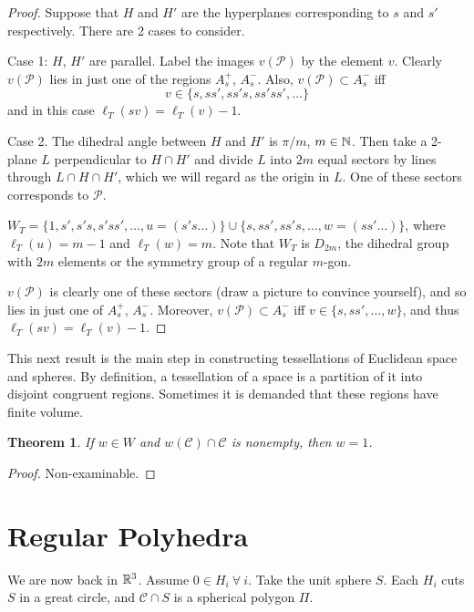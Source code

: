 \documentclass{notes}
\theoremstyle{plain}
\newtheorem{theorem}[proposition]{Theorem}
\newcommand{\cC}{\mathcal{C}}
\newcommand{\cP}{\mathcal{P}}
\begin{document}
\begin{proof}
Suppose that $H$ and $H'$ are the hyperplanes corresponding to $s$ and $s'$
respectively.  There are 2 cases to consider.

Case 1: $H$, $H'$ are parallel.  Label the images $v(\cP)$ by the element $v$.
Clearly $v(\cP)$ lies in just one of the regions $A_s^+$, $A_s^-$.  Also,
$v(\cP) \subset A_s^-$ iff
\[
v \in \{s, s s', s s' s, s s' s s', \dots \}
\]
and in this case $\ell_T(sv) = \ell_T(v) - 1$.

Case 2.  The dihedral angle between $H$ and $H'$ is $\pi/m$, $m \in \mathbb{N}$.  Then
take a 2-plane $L$ perpendicular to $H \cap H'$ and divide $L$ into $2m$ equal
sectors by lines through $L \cap H \cap H'$, which we will regard as the origin
in $L$.  One of these sectors corresponds to $\cP$.

$W_T = \{1, s', s's, s'ss', \dots, u=(s's \dots) \} \cup \{ s, ss', ss's,
 \dots, w=(ss'\dots)\}$, where $\ell_T(u) = m-1$ and $\ell_T(w) = m$.  Note
that $W_T$ is $D_{2m}$, the dihedral group with $2 m$ elements or the symmetry
group of a regular $m$-gon.

$v(\cP)$ is clearly one of these sectors (draw a picture to convince
yourself), and so lies in just one of $A_s^+$, $A_s^-$.  Moreover,
$v(\cP) \subset A_s^-$ iff $v \in \{s, ss', \dots, w\}$, and thus
$\ell_T(s v) = \ell_T(v) - 1$.
\end{proof}

This next result is the main step in constructing tessellations of Euclidean
space and spheres.  By definition, a tessellation of a space is a partition of
it into disjoint congruent regions.  Sometimes it is demanded that these
regions have finite volume.

\begin{theorem}
If $w \in W$ and $w(\cC) \cap \cC$ is nonempty, then $w = 1$.
\end{theorem}

\begin{proof}
Non-examinable.
\end{proof}

\section{Regular Polyhedra}

We are now back in $\mathbb{R}^3$.  Assume $0 \in H_i\ \forall\ i$.  Take the unit
sphere $S$.  Each $H_i$ cuts $S$ in a great circle, and $\cC \cap S$ is a
spherical polygon $\Pi$.
\end{document}
